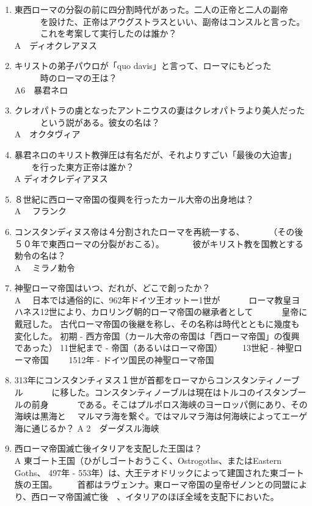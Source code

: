 \documentclass[fleqn]{article}
\begin{document}
\begin{enumerate}
\item{
東西ローマの分裂の前に四分割時代があった。二人の正帝と二人の副帝
　　　を設けた、正帝はアウグストラスといい、副帝はコンスルと言った。
　　　これを考案して実行したのは誰か？\\
\vspace{1zw}A　ディオクレアヌス
}
\item{
キリストの弟子パウロが「quo davis」と言って、ローマにもどった
　　　時のローマの王は？\\
\vspace{1zw}A6　暴君ネロ
}
\item{
クレオパトラの虜となったアントニウスの妻はクレオパトラより美人だった
　　　という説がある。彼女の名は？\\
\vspace{1zw}A　オクタヴィア
}
\item{
暴君ネロのキリスト教弾圧は有名だが、それよりすごい「最後の大迫害」
　　を行った東方正帝は誰か？\\
\vspace{1zw}A  ディオクレディアヌス
}
\item{
８世紀に西ローマ帝国の復興を行ったカール大帝の出身地は？\\
\vspace{1zw}A 　フランク
}
\item{
コンスタンディヌス帝は４分割されたローマを再統一する、
　　　（その後５０年で東西ローマの分裂がおこる）。
　　　彼がキリスト教を国教とする勅令の名は？\\
\vspace{1zw}A 　ミラノ勅令
}
\item{
 神聖ローマ帝国はいつ、だれが、どこで創ったか？\\
\vspace{1zw}A 　日本では通俗的に、962年ドイツ王オットー1世が
　　　ローマ教皇ヨハネス12世により、カロリング朝的ローマ帝国の継承者として
　　　皇帝に戴冠した。
	古代ローマ帝国の後継を称し、その名称は時代とともに幾度も変化した。
	初期 - 西方帝国（カール大帝の帝国は「西ローマ帝国」の復興であった）
	11世紀まで - 帝国（あるいはローマ帝国）
　　13世紀 - 神聖ローマ帝国
　　1512年 - ドイツ国民の神聖ローマ帝国
}
\item{
313年にコンスタンチィヌス１世が首都をローマからコンスタンティノーブル
　　　に移した。コンスタンティノーブルは現在はトルコのイスタンブールの前身
　　　である。そこはプルポロス海峡のヨーロッパ側にあり、その海峡は黒海と
	　マルマラ海を繋ぐ。ではマルマラ海は何海峡によってエーゲ海に通じるか？
\vspace{1zw}A 
2　ダーダスル海峡
}
\item{
西ローマ帝国滅亡後イタリアを支配した王国は？\\
\vspace{1zw}A  
東ゴート王国（ひがしゴートおうこく、Ostrogoths、またはEastern Goths、
	497年 - 553年）は、大王テオドリックによって建国された東ゴート族の王国。
　　首都はラヴェンナ。東ローマ帝国の皇帝ゼノンとの同盟により、西ローマ帝国滅亡後　、イタリアのほぼ全域を支配下においた。
}


\end{enumerate}
\end{document}
